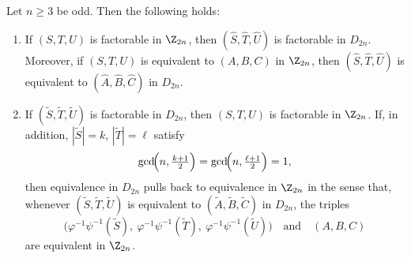 \documentclass{file}
\newcommand{\Aut}{\mathsf{Aut}}
\begin{document}
\begin{thm}\label{thm:Z2n-to-D2n-factorable}
Let $n\ge 3$ be odd. 
Then the following holds:
\begin{enumerate}
\item If $(S,T,U)$ is factorable in $\Z_{2n}$,
then $(\widehat S,\widehat T,\widehat U)$ is factorable in $D_{2n}$.
Moreover, if $(S,T,U)$ is equivalent to $(A,B,C)$ in $\Z_{2n}$, then
$(\widehat S,\widehat T,\widehat U)$ is equivalent to $(\widehat A,\widehat B,\widehat C)$
in $D_{2n}$.
\item If $(\widetilde S,\widetilde T,\widetilde U)$ is factorable in $D_{2n}$, then
$(S,T,U)$ is factorable in $\Z_{2n}$. 
If, in addition,
$|\widetilde S|=k$, $|\widetilde T|=\ell$ satisfy
\[
\gcd\!\Bigl(n,\tfrac{k+1}{2}\Bigr)=\gcd\!\Bigl(n,\tfrac{\ell+1}{2}\Bigr)=1,
\]
then equivalence in $D_{2n}$ pulls back to equivalence in $\Z_{2n}$ in the sense that, whenever
$(\widetilde S,\widetilde T,\widetilde U)$ is equivalent to $(\widetilde A,\widetilde B,\widetilde C)$ in
$D_{2n}$, the triples
\[
\bigl(\varphi^{-1}\psi^{-1}(\widetilde S),\ \varphi^{-1}\psi^{-1}(\widetilde T),\ \varphi^{-1}\psi^{-1}(\widetilde U)\bigr)
\quad\text{and}\quad
(A,B,C)
\]
are equivalent in $\Z_{2n}$.
\end{enumerate}
\end{thm}
\end{document}
